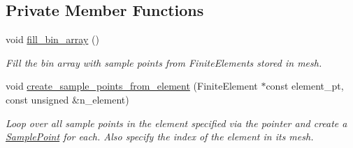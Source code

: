 \subsection*{Private Member Functions}
\begin{DoxyCompactItemize}
\item 
void \hyperlink{classRefineableBinArray_a89a3c1f13eeceec0fb11e399cc58d57d}{fill\+\_\+bin\+\_\+array} ()
\begin{DoxyCompactList}\small\item\em Fill the bin array with sample points from Finite\+Elements stored in mesh. \end{DoxyCompactList}\item 
void \hyperlink{classRefineableBinArray_ac8f32afc025239c62a5d7e7e2535313e}{create\+\_\+sample\+\_\+points\+\_\+from\+\_\+element} (Finite\+Element $\ast$const element\+\_\+pt, const unsigned \&n\+\_\+element)
\begin{DoxyCompactList}\small\item\em Loop over all sample points in the element specified via the pointer and create a \hyperlink{classSamplePoint}{Sample\+Point} for each. Also specify the index of the element in its mesh. \end{DoxyCompactList}\end{DoxyCompactItemize}
